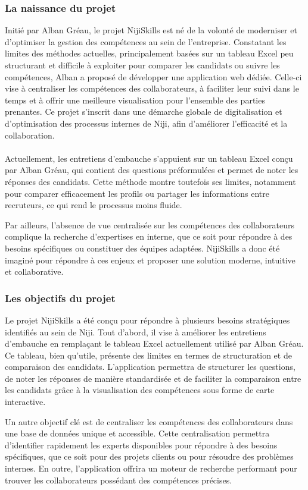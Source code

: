 \documentclass[12pt]{article}
\begin{document}
\subsubsection{La naissance du projet}
Initié par Alban Gréau, le projet NijiSkills est né de la volonté de moderniser et d’optimiser la gestion des compétences au sein de l’entreprise. Constatant les limites des méthodes actuelles, principalement basées sur un tableau Excel peu structurant et difficile à exploiter pour comparer les candidats ou suivre les compétences, Alban a proposé de développer une application web dédiée. Celle-ci vise à centraliser les compétences des collaborateurs, à faciliter leur suivi dans le temps et à offrir une meilleure visualisation pour l’ensemble des parties prenantes. Ce projet s’inscrit dans une démarche globale de digitalisation et d’optimisation des processus internes de Niji, afin d’améliorer l’efficacité et la collaboration.
\\\\
Actuellement, les entretiens d’embauche s’appuient sur un tableau Excel conçu par Alban Gréau, qui contient des questions préformulées et permet de noter les réponses des candidats. Cette méthode montre toutefois ses limites, notamment pour comparer efficacement les profils ou partager les informations entre recruteurs, ce qui rend le processus moins fluide.

Par ailleurs, l’absence de vue centralisée sur les compétences des collaborateurs complique la recherche d’expertises en interne, que ce soit pour répondre à des besoins spécifiques ou constituer des équipes adaptées. NijiSkills a donc été imaginé pour répondre à ces enjeux et proposer une solution moderne, intuitive et collaborative.
\subsubsection{Les objectifs du projet}
Le projet NijiSkills a été conçu pour répondre à plusieurs besoins stratégiques identifiés au sein de Niji. Tout d'abord, il vise à améliorer les entretiens d'embauche en remplaçant le tableau Excel actuellement utilisé par Alban Gréau. Ce tableau, bien qu'utile, présente des limites en termes de structuration et de comparaison des candidats. L'application permettra de structurer les questions, de noter les réponses de manière standardisée et de faciliter la comparaison entre les candidats grâce à la visualisation des compétences sous forme de carte interactive.

Un autre objectif clé est de centraliser les compétences des collaborateurs dans une base de données unique et accessible. Cette centralisation permettra d'identifier rapidement les experts disponibles pour répondre à des besoins spécifiques, que ce soit pour des projets clients ou pour résoudre des problèmes internes. En outre, l'application offrira un moteur de recherche performant pour trouver les collaborateurs possédant des compétences précises.
\end{document}

